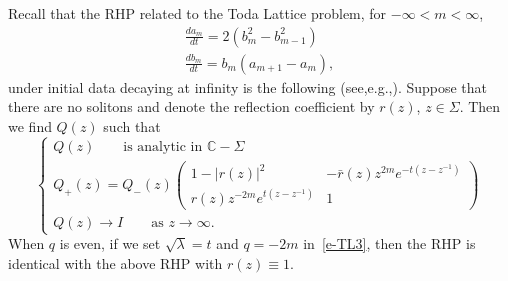 \documentclass{amsart}
\theoremstyle{definition}
\theoremstyle{remark}
\numberwithin{equation}{section}
\newcommand{\C}{\mathbb C}
\begin{document}
Recall that the RHP related to the Toda Lattice problem, for 
$-\infty<m<\infty$, 
\begin{equation}
  \begin{split}
     \frac{da_m}{dt}=2(b^2_{m}-b^2_{m-1})\\
     \frac{db_m}{dt}=b_{m}(a_{m+1}-a_{m}), 
  \end{split}
\end{equation}
under initial data decaying at infinity is the following (see,e.g.,\cite{Ka}).
Suppose that there are no solitons and denote the   
reflection coefficient by $r(z)$, $z\in\Sigma$.  
Then we find $Q(z)$ such that 
\begin{equation}
  \begin{cases}
     Q(z) \qquad\text{is analytic in $\C-\Sigma$}\\
     Q_+(z)=Q_-(z)\begin{pmatrix} 1-|r(z)|^2&-\bar{r}(z)z^{2m}e^{-t(z-z^{-1})}\\
r(z)z^{-2m}e^{t(z-z^{-1})}&1 \end{pmatrix}\\
     Q(z)\to I \qquad\text{as $z\to\infty$}.
  \end{cases}
\end{equation}
When $q$ is even, if we set $\sqrt{\lambda}=t$ and $q=-2m$ in~\eqref{e-TL3}, 
then the RHP is identical with the above RHP 
with $r(z)\equiv 1$.
\end{document}
